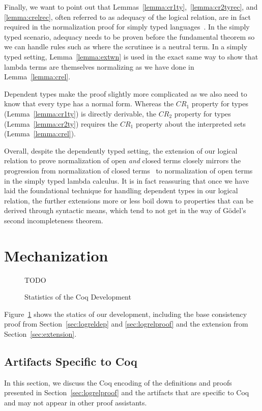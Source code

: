 \documentclass[acmsmall]{acmart}
\begin{document}
Finally, we want to point out that
Lemmas~\ref{lemma:cr1ty},~\ref{lemma:cr2tyrec}, and
\ref{lemma:crelrec}, often referred to as adequacy of the logical
relation, are in fact required in the normalization proof for simply
typed languages~\citep{abel2019poplmark}. In the simply typed
scenario, adequacy needs to be proven before the fundamental theorem
so we can handle rules such as  where the scrutinee is a
neutral term. In a simply typed setting, Lemma~\ref{lemma:extwn} is
used in the exact same way to show that lambda terms are themselves
normalizing as we have done in Lemma~\ref{lemma:crel}.

Dependent types make the proof slightly more complicated
as we also need to know that every type has a normal form. Whereas the
$CR_1$ property for types (Lemma~\ref{lemma:cr1ty}) is directly
derivable, the $CR_2$ property for types (Lemma~\ref{lemma:cr2ty})
requires the $CR_1$ property about the interpreted sets
(Lemma~\ref{lemma:crel}).

Overall, despite the dependently typed setting,
the extension of our logical relation to prove normalization of open
\emph{and} closed terms closely mirrors the progression from
normalization of closed terms~\citep{harpertait} to normalization of
open terms~\citep{harperkripke} in the simply typed lambda calculus.
It is in fact reassuring that once we have laid the foundational
technique for handling dependent types in our logical relation, the
further extensions more or less boil down to properties that can be
derived through syntactic means, which tend to not get in the way of
Gödel's second incompleteness theorem.

\section{Mechanization}
\label{sec:logrelmech}
\begin{figure}[h]
  TODO
  \caption{Statistics of the Coq Development}
  \label{fig:linecount}
\end{figure}


Figure~\ref{fig:linecount} shows the statics of our
development, including the base consistency proof from
Section~\ref{sec:logreldep} and \ref{sec:logrelproof} and the
extension from Section~\ref{sec:extension}.

\subsection{Artifacts Specific to Coq}
In this section, we discuss the Coq encoding of the definitions and proofs presented
in Section~\ref{sec:logrelproof}  and the artifacts that are
specific to Coq and may not appear in other proof assistants.
\end{document}
